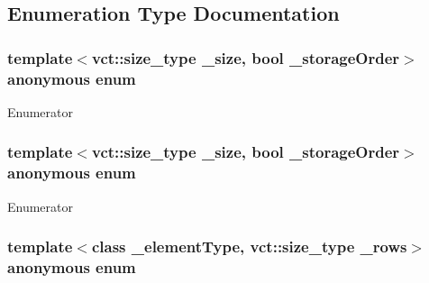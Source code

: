 \subsection{Enumeration Type Documentation}
\hypertarget{group__cisst_numerical_ga8d5c908167a6894978180395e058b508}{}\subsubsection[{anonymous enum}]{\setlength{\rightskip}{0pt plus 5cm}template$<$vct\+::size\+\_\+type \+\_\+size, bool \+\_\+storage\+Order$>$ anonymous enum}\label{group__cisst_numerical_ga8d5c908167a6894978180395e058b508}
\begin{Desc}
\item[Enumerator]\par
\begin{description}
\item[{\em 
\hypertarget{group__cisst_numerical_gga8d5c908167a6894978180395e058b508a23462bd6af096d6bf2b131c334abb82f}{}N\+B\label{group__cisst_numerical_gga8d5c908167a6894978180395e058b508a23462bd6af096d6bf2b131c334abb82f}
}]\end{description}
\end{Desc}
\hypertarget{group__cisst_numerical_ga2e2073f4c63489b707f4e763a998904f}{}\subsubsection[{anonymous enum}]{\setlength{\rightskip}{0pt plus 5cm}template$<$vct\+::size\+\_\+type \+\_\+size, bool \+\_\+storage\+Order$>$ anonymous enum}\label{group__cisst_numerical_ga2e2073f4c63489b707f4e763a998904f}
\begin{Desc}
\item[Enumerator]\par
\begin{description}
\item[{\em 
\hypertarget{group__cisst_numerical_gga2e2073f4c63489b707f4e763a998904fabce89457be6eebf067cb0e442a2cb35f}{}L\+W\+O\+R\+K\label{group__cisst_numerical_gga2e2073f4c63489b707f4e763a998904fabce89457be6eebf067cb0e442a2cb35f}
}]\end{description}
\end{Desc}
\hypertarget{group__cisst_numerical_ga664e774b6eb2e7cdc1dd1c0c09bbce8a}{}\subsubsection[{anonymous enum}]{\setlength{\rightskip}{0pt plus 5cm}template$<$class \+\_\+element\+Type, vct\+::size\+\_\+type \+\_\+rows$>$ anonymous enum}\label{group__cisst_numerical_ga664e774b6eb2e7cdc1dd1c0c09bbce8a}
